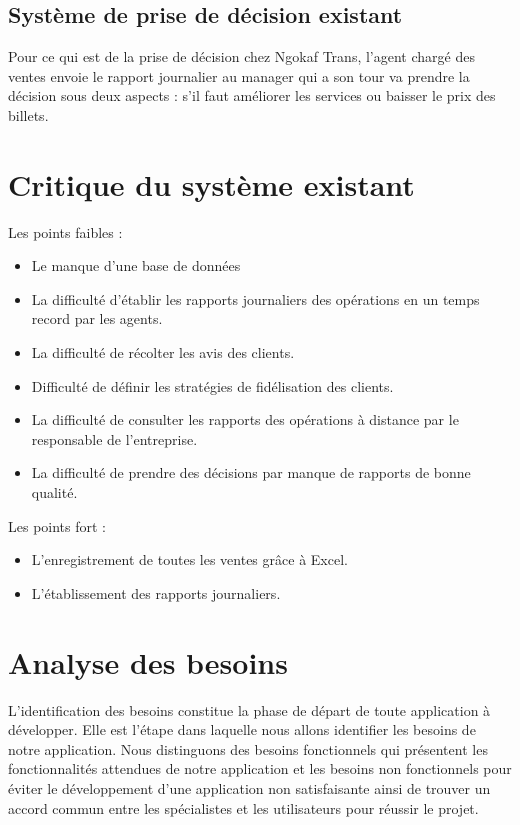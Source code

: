         \subsection[Système de prise de décision existant]{Système de prise de décision existant}
        Pour ce qui est de la prise de décision chez Ngokaf Trans, l’agent chargé des ventes
        envoie le rapport journalier au manager qui a son tour va prendre la décision sous deux
        aspects : s’il faut améliorer les services ou baisser le prix des billets.
    \section[Critique du système existant]{Critique du système existant}
    \par
    Les points faibles :
    \par
        \begin{itemize}
            \setlength{\itemsep}{0pt}
            \item [\ding{226}] Le manque d’une base de données
            \item [\ding{226}] La difficulté d’établir les rapports journaliers des opérations en un temps
            record par les agents.
            \item [\ding{226}] La difficulté de récolter les avis des clients. 
            \item [\ding{226}] Difficulté de définir les stratégies de fidélisation des clients.
            \item [\ding{226}] La difficulté de consulter les rapports des opérations à distance par le
            responsable de l’entreprise.
            \item [\ding{226}] La difficulté de prendre des décisions par manque de rapports de bonne
            qualité.
        \end{itemize}
    \par
    Les points fort :
    \par
        \begin{itemize}
            \setlength{\itemsep}{0pt}
            \item [\ding{226}] L’enregistrement de toutes les ventes grâce à Excel.
            \item [\ding{226}] L’établissement des rapports journaliers.
        \end{itemize}
    \section[Analyse des besoins]{Analyse des besoins}
    L’identification des besoins constitue la phase de départ de toute
    application à développer. Elle est l’étape dans laquelle nous allons identifier
    les besoins de notre application. Nous distinguons des besoins
    fonctionnels qui présentent les fonctionnalités attendues de notre
    application et les besoins non fonctionnels pour éviter le développement
    d’une application non satisfaisante ainsi de trouver un
    accord commun entre les spécialistes et les utilisateurs pour réussir le projet.

